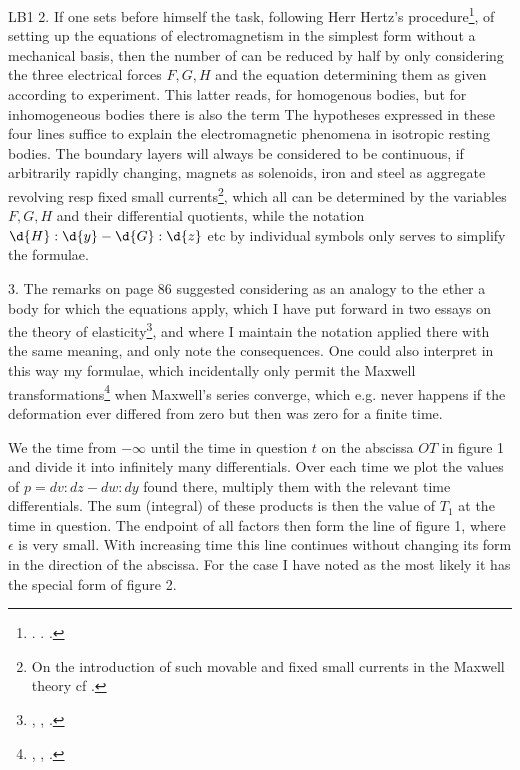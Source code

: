 \begin{paper}{LB1}
2. If one sets before himself the task, following Herr Hertz's procedure\footnote{ .   .  \citeyear{1892}.}, of setting up the equations of electromagnetism in the simplest form without a mechanical basis, then the number of  can be reduced by half by only considering the three electrical forces $F,G,H$ and the equation determining them as given according to experiment. This latter reads, for homogenous bodies,
but for inhomogeneous bodies there is also the term
The hypotheses expressed in these four lines suffice to explain the electromagnetic phenomena in isotropic resting bodies. The boundary layers will always be considered to be continuous, if arbitrarily rapidly changing, magnets as solenoids, iron and steel as aggregate revolving resp fixed small currents\footnote{On the introduction of such movable and fixed small currents in the Maxwell theory cf  \citeyear{1891}.}, which all can be determined by the variables $F,G,H$ and their differential quotients, while the notation $\d{H}:\d{y} - \d{G}:\d{z}$ etc by individual symbols only serves to simplify the formulae.

3. The remarks on page 86 suggested considering as an analogy to the ether a body for which the equations apply, which I have put forward in two essays on the theory of elasticity\footnote{  , , .}, and where I maintain the notation applied there with the same meaning, and only note the consequences. One could also interpret in this way my formulae, which incidentally only permit the Maxwell transformations\footnote{\citeauthor{Maxwell}, , .} when Maxwell's series converge, which e.g. never happens if the deformation ever differed from zero but then was zero for a finite time.

We  the time from $-\infty$ until the time in question $t$ on the abscissa $OT$ in figure 1 and divide it into infinitely many differentials. Over each time we plot the values of $p=dv:dz - dw:dy$ found there, multiply them with the relevant time differentials. The sum (integral) of these products is then the value of $T_1$ at the time in question. The endpoint of all factors then form the line of figure 1, where $\epsilon$ is very small. With increasing time this line continues without changing its form in the direction of the abscissa. For the case I have noted as the most likely it has the special form of figure 2.


\end{paper}
